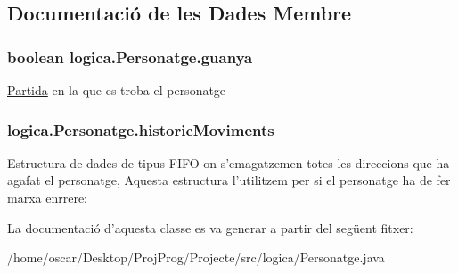 \subsection{Documentació de les Dades Membre}
\hypertarget{classlogica_1_1_personatge_a0c30dc6ca85f941043ae4a27e7583c67}{
\subsubsection[{guanya}]{\setlength{\rightskip}{0pt plus 5cm}boolean logica.\+Personatge.\+guanya\hspace{0.3cm}{\ttfamily [protected]}}}\label{classlogica_1_1_personatge_a0c30dc6ca85f941043ae4a27e7583c67}
\hyperlink{classlogica_1_1_partida}{Partida} en la que es troba el personatge \hypertarget{classlogica_1_1_personatge_a86322efbc950e2954fe2a8cde806bbd9}{
\subsubsection[{historic\+Moviments}]{ logica.\+Personatge.\+historic\+Moviments\hspace{0.3cm}{\ttfamily [protected]}}}\label{classlogica_1_1_personatge_a86322efbc950e2954fe2a8cde806bbd9}
Estructura de dades de tipus F\+I\+F\+O on s'emagatzemen totes les direccions que ha agafat el personatge, Aquesta estructura l'utilitzem per si el personatge ha de fer marxa enrrere; 

La documentació d'aquesta classe es va generar a partir del següent fitxer\+:\begin{DoxyCompactItemize}
\item 
/home/oscar/\+Desktop/\+Proj\+Prog/\+Projecte/src/logica/Personatge.\+java\end{DoxyCompactItemize}
